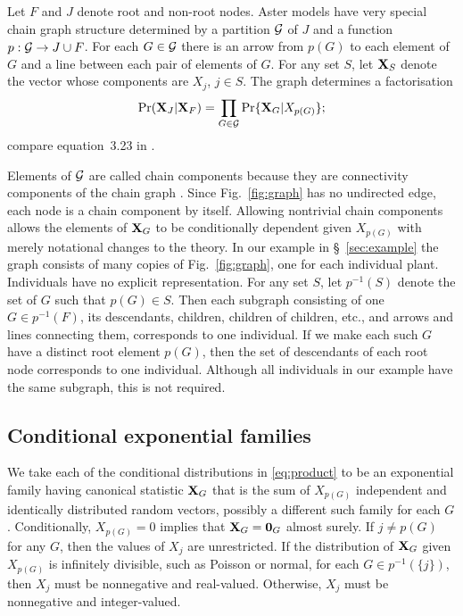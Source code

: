Let $F$ and $J$ denote root and non-root nodes.  Aster models have very
special chain graph structure determined by a partition $\mathcal{G}$ of $J$ and
a function $p : \mathcal{G} \to J \cup F$.
For each $G \in \mathcal{G}$ there is
an arrow from $p(G)$ to each element of $G$ and a line
between each pair of elements of $G$.
For any set $S$, let $\mathbf{X}_S$ denote the
vector whose components are $X_j$, $j \in S$.
The graph determines a factorisation
\begin{equation} \label{eq:product}
   \Pr(\mathbf{X}_J | \mathbf{X}_F)
   =
   \prod_{G \in \mathcal{G}} \Pr \{ \mathbf{X}_G | X_{p(G)} \};
\end{equation}
compare equation~3.23 in \citet{lauritzen}.

Elements of $\mathcal{G}$ are called
chain components
because they are connectivity components of the chain graph
\citep[pp.~6--7]{lauritzen}.
Since Fig.~\ref{fig:graph} has no undirected edge,
each node is a chain component by itself.
Allowing nontrivial chain components
allows the elements of $\mathbf{X}_G$ to be conditionally dependent
given $X_{p(G)}$ with merely notational changes to the theory.
In our example in \S~\ref{sec:example}
the graph consists of many copies of Fig.~\ref{fig:graph}, one for each
individual plant.  Individuals have no explicit representation.
For any set $S$, let $p^{-1}(S)$ denote the set of $G$ such that $p(G) \in S$.
Then each subgraph consisting of one $G \in p^{-1}(F)$, its descendants,
children, children of children, etc., and arrows and lines connecting them,
corresponds to one individual.
If we make each such $G$ have a distinct root element $p(G)$, then
the set of descendants of each root node corresponds to one individual.
Although all individuals in our example have the same subgraph, this is
not required.

\subsection{Conditional exponential families} \label{sec:CEF}

We take each of the conditional distributions in \eqref{eq:product}
to be an exponential family having canonical statistic $\mathbf{X}_G$ 
that is the sum of $X_{p(G)}$
independent and identically distributed random vectors,
possibly a different such family for each $G$.
Conditionally, $X_{p(G)} = 0$ implies that $\mathbf{X}_G = {\boldsymbol{0}}_G$ almost surely.
If $j \neq p(G)$ for any $G$, then the
values of $X_j$ are unrestricted.
If the distribution of $\mathbf{X}_G$ given $X_{p(G)}$ is infinitely
divisible, such as Poisson or normal, for each $G \in p^{-1}(\{j\})$,
then $X_j$ must be nonnegative and real-valued.
Otherwise, $X_j$ must be nonnegative and integer-valued.


